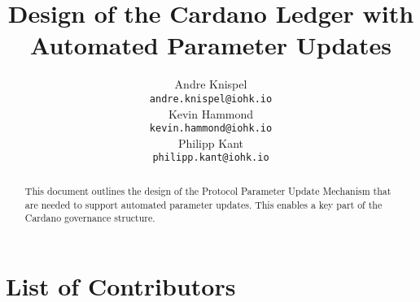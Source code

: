 

\cleardoublepage
\renewcommand{\thepage}{\arabic{page}}
\setcounter{page}{1}

\title{Design of the Cardano Ledger with Automated Parameter Updates}

\author{
   Andre Knispel \\ {\small \texttt{andre.knispel@iohk.io}} \\
   Kevin Hammond \\ {\small \texttt{kevin.hammond@iohk.io}} \\
   Philipp Kant \\ {\small \texttt{philipp.kant@iohk.io}} \\
   }

\date{}

\maketitle

\begin{abstract}
  This document outlines the design of the Protocol Parameter Update Mechanism that are needed to support
  automated parameter updates.  This enables a key part of the Cardano governance structure.
\end{abstract}

\section*{List of Contributors}
\label{acknowledgements}

